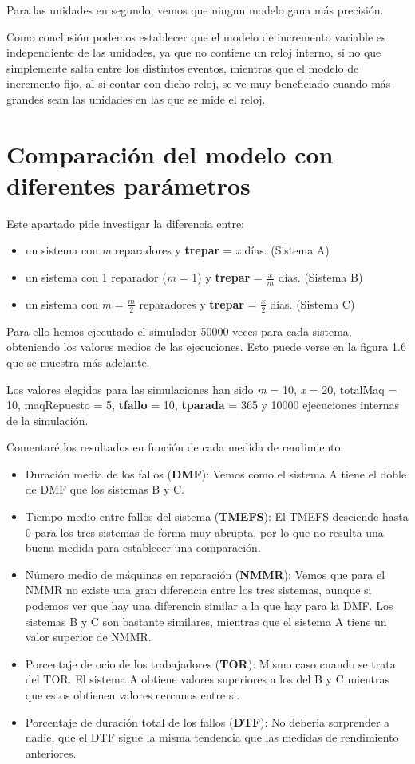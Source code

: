 Para las unidades en segundo, vemos que ningun modelo gana más precisión.

Como conclusión podemos establecer que el modelo de incremento variable es independiente de las unidades, ya que no contiene un reloj interno, si no que simplemente salta entre los distintos eventos, mientras que el modelo de incremento fijo, al si contar con dicho reloj, se ve muy beneficiado cuando más grandes sean las unidades en las que se mide el reloj.

\section{Comparación del modelo con diferentes parámetros}

Este apartado pide investigar la diferencia entre:
\begin{itemize}
	\item un sistema con \textit{m} reparadores y \textbf{trepar} = \textit{x} días. (Sistema A)
	\item un sistema con 1 reparador (\textit{m} = 1) y \textbf{trepar} = $\frac{x}{m}$ días. (Sistema B)
	\item un sistema con \textit{m} = $\frac{m}{2} $ reparadores y \textbf{trepar} = $\frac{x}{2}$ días. (Sistema C)
\end{itemize}

Para ello hemos ejecutado el simulador 50000 veces para cada sistema, obteniendo los valores medios de las ejecuciones. Esto puede verse en la figura 1.6 que se muestra más adelante.

Los valores elegidos para las simulaciones han sido \textit{m} = 10, \textit{x} = 20, totalMaq = 10, maqRepuesto = 5, \textbf{tfallo} = 10, \textbf{tparada} = 365 y 10000 ejecuciones internas de la simulación.

Comentaré los resultados en función de cada medida de rendimiento:
\begin{itemize}
	\item Duración media de los fallos (\textbf{DMF}): Vemos como el sistema A tiene el doble de DMF que los sistemas B y C.
	\item Tiempo medio entre fallos del sistema (\textbf{TMEFS}): El TMEFS desciende hasta 0 para los tres sistemas de forma muy abrupta, por lo que no resulta una buena medida para establecer una comparación.
	\item Número medio de máquinas en reparación (\textbf{NMMR}): Vemos que para el NMMR no existe una gran diferencia entre los tres sistemas, aunque si podemos ver que hay una diferencia similar a la que hay para la DMF. Los sistemas B y C son bastante similares, mientras que el sistema A tiene un valor superior de NMMR.
	\item Porcentaje de ocio de los trabajadores (\textbf{TOR}): Mismo caso cuando se trata del TOR. El sistema A obtiene valores superiores a los del B y C mientras que estos obtienen valores cercanos entre si.
	\item Porcentaje de duración total de los fallos  (\textbf{DTF}): No deberia sorprender a nadie, que el DTF sigue la misma tendencia que las medidas de rendimiento anteriores.
\end{itemize}

